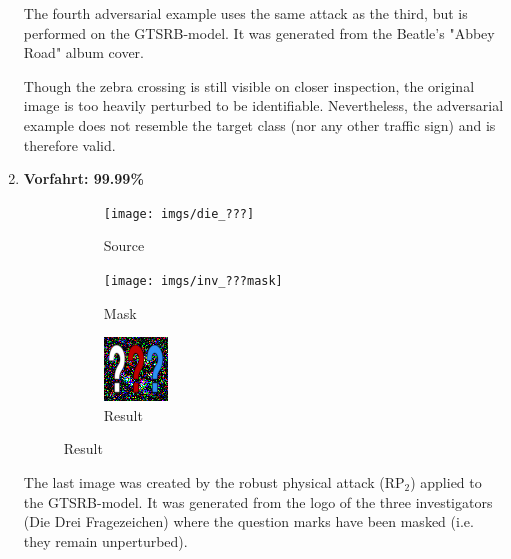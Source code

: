 \begin{enumerate}
The fourth adversarial example uses the same attack as the third, but is performed on the GTSRB-model.
It was generated from the Beatle's "Abbey Road" album cover.

Though the zebra crossing is still visible on closer inspection, the original image is too heavily perturbed to be identifiable. 
Nevertheless, the adversarial example does not resemble the target class (nor any other traffic sign) and is therefore valid.

\item
\textbf{Vorfahrt: 99.99\%}

\begin{figure}[!h]
\begin{subfigure}{.19\linewidth}
  \centering
  \texttt{[image: imgs/die\_???]}
  \caption{Source}
\end{subfigure}
\hspace{0.05\linewidth}
\begin{subfigure}{.19\linewidth}
  \centering
  \texttt{[image: imgs/inv\_???mask]}
  \caption{Mask}
\end{subfigure}
\hspace{0.05\linewidth}
\begin{subfigure}{.19\linewidth}
  \centering
  \includegraphics[width=0.7\linewidth]{imgs/20}
  \caption{Result}
\end{subfigure}
\end{figure}

The last image was created by the robust physical attack (RP$_2$) applied to the GTSRB-model.
It was generated from the logo of the three investigators (Die Drei Fragezeichen) where the question marks have been masked (i.e. they remain unperturbed).

\end{enumerate}
